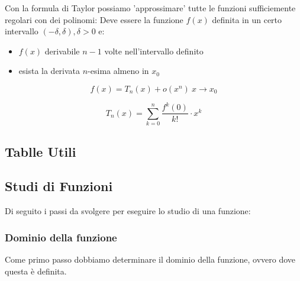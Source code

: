\documentclass[../analisi.tex]{subfiles}
\begin{document}
\begin{defn}
	Con la formula di Taylor possiamo 'approssimare'  tutte
	le funzioni sufficiemente regolari con dei polinomi:
	Deve essere la funzione $ f ( x ) $ definita in un certo intervallo $ 
	( -\delta, \delta ), \delta > 0 $ e:
	\begin{itemize}
		\item $ f(x) $ derivabile $ n-1 $ volte nell'intervallo definito
		\item esista la derivata $ n $-esima almeno in $ x_0 $
	\end{itemize}

	\begin{equation}
		f(x) = T_n (x) + o (x^n)\ x \to x_0 
	\end{equation}

	\begin{equation}
		T_n (x) = \sum^{n}_{k=0} \frac{f^{k} (0)}{k!} \cdot x^k
	\end{equation}

\end{defn}





\subsection{Tablle Utili}%
\label{sub:tablle_utili}


\clearpage

\clearpage


\subsection{Studi di Funzioni}%
\label{sub:studi_di_funzioni} 
Di seguito i passi da svolgere per eseguire lo studio di una funzione:
\subsubsection{Dominio della funzione}
Come primo passo dobbiamo determinare il dominio della funzione,
ovvero dove questa è definita.
\end{document}
